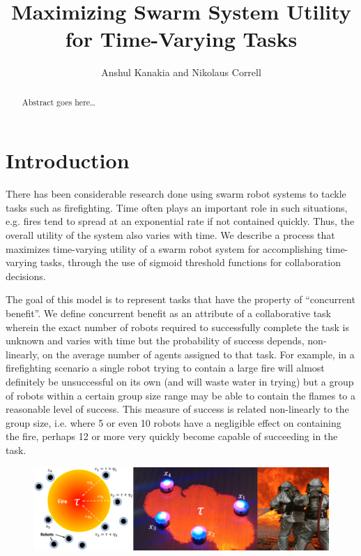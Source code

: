 \documentclass{sage}
\begin{document}
\title{Maximizing Swarm System Utility for Time-Varying Tasks}
\author{Anshul Kanakia and Nikolaus Correll}
\address{Department of Computer Science,
	University of Colorado, Boulder, USA}

\maketitle

\begin{abstract}
Abstract goes here\ldots
\end{abstract}

\section{Introduction}
There has been considerable research done using swarm robot systems to tackle tasks  such as firefighting. Time often plays an important role in such situations, e.g. fires tend to spread at an exponential rate if not contained quickly. Thus, the overall utility of the system also varies with time. We describe a process that maximizes time-varying utility of a swarm robot system for accomplishing time-varying tasks, through the use of sigmoid threshold functions for collaboration decisions.

The goal of this model is to represent tasks that have the property of ``concurrent benefit''. We define concurrent benefit as an attribute of a collaborative task wherein the exact number of robots required to successfully complete the task is unknown and varies with time but the probability of success depends, non-linearly, on the average number of agents assigned to that task. For example, in a firefighting scenario a single robot trying to contain a large fire will almost definitely be unsuccessful on its own (and will waste water in trying) but a group of robots within a certain group size range may be able to contain the flames to a reasonable level of success. This measure of success is related non-linearly to the group size, i.e. where 5 or even 10 robots have a negligible effect on containing the fire, perhaps 12 or more very quickly become capable of succeeding in the task.

\begin{figure}[!ht]
\centering\includegraphics[width=\textwidth]{../figures/dropletfire.png}
\centering\caption{}\label{fig:dropletfire}
\end{figure}
\end{document}
